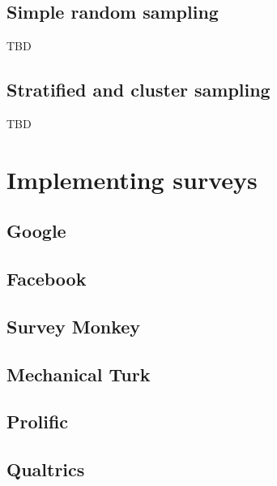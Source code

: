 \documentclass[
]{book}
\begin{document}
\hypertarget{simple-random-sampling}{%
\subsection{Simple random sampling}\label{simple-random-sampling}}

TBD

\hypertarget{stratified-and-cluster-sampling}{%
\subsection{Stratified and cluster sampling}\label{stratified-and-cluster-sampling}}

TBD

\hypertarget{implementing-surveys}{%
\section{Implementing surveys}\label{implementing-surveys}}

\hypertarget{google}{%
\subsection{Google}\label{google}}

\hypertarget{facebook}{%
\subsection{Facebook}\label{facebook}}

\hypertarget{survey-monkey}{%
\subsection{Survey Monkey}\label{survey-monkey}}

\hypertarget{mechanical-turk}{%
\subsection{Mechanical Turk}\label{mechanical-turk}}

\hypertarget{prolific}{%
\subsection{Prolific}\label{prolific}}

\hypertarget{qualtrics}{%
\subsection{Qualtrics}\label{qualtrics}}
\end{document}
